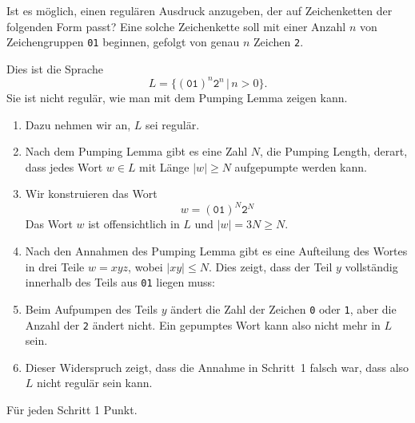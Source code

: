 Ist es möglich, einen regulären Ausdruck anzugeben, der auf Zeichenketten
der folgenden Form passt?
Eine solche Zeichenkette soll mit einer Anzahl $n$ von Zeichengruppen
\texttt{01} beginnen, gefolgt von genau $n$ Zeichen \texttt{2}.


\begin{loesung}
Dies ist die Sprache 
\[
L = \{ (\texttt{01})^n\texttt{2}^n\,|\, n>0\}.
\]
Sie ist nicht regulär, wie man mit dem Pumping Lemma zeigen kann.
\begin{enumerate}
\item
Dazu nehmen wir an, $L$ sei regulär.
\item
Nach dem Pumping Lemma gibt es eine Zahl $N$, die Pumping Length, derart,
dass jedes Wort $w\in L$ mit Länge $|w|\ge N$ aufgepumpte werden kann.
\item
Wir konstruieren das Wort
\[
w = (\texttt{01})^N\texttt{2}^N
\]
Das Wort $w$ ist offensichtlich in $L$ und $|w|=3N\ge N$.
\item
Nach den Annahmen des Pumping Lemma gibt es eine Aufteilung des
Wortes in drei Teile $w=xyz$, wobei $|xy|\le N$.
Dies zeigt, dass der Teil $y$ vollständig innerhalb des Teils
aus \texttt{01} liegen muss:
\begin{center}
\end{center}
\item
Beim Aufpumpen des Teils $y$ ändert die Zahl der Zeichen \texttt{0}
oder \texttt{1}, aber die Anzahl der \texttt{2} ändert nicht.
Ein gepumptes Wort kann also nicht mehr in $L$ sein.
\item
Dieser Widerspruch zeigt, dass die Annahme in Schritt~1 
falsch war, dass also $L$ nicht regulär sein kann.
\qedhere
\end{enumerate}
\end{loesung}

\begin{bewertung}
Für jeden Schritt 1 Punkt.
\end{bewertung}


